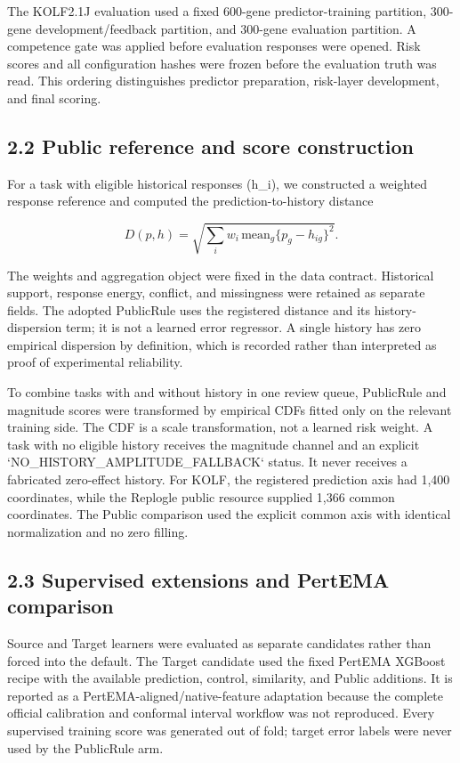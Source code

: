 \documentclass[journal]{IEEEtran}
\begin{document}
The KOLF2.1J evaluation used a fixed 600-gene predictor-training partition, 300-gene development/feedback partition, and 300-gene evaluation partition. A competence gate was applied before evaluation responses were opened. Risk scores and all configuration hashes were frozen before the evaluation truth was read. This ordering distinguishes predictor preparation, risk-layer development, and final scoring.

\subsection{2.2 Public reference and score construction}

For a task with eligible historical responses (h\_i), we constructed a weighted response reference and computed the prediction-to-history distance

\[
D(p,h)=\sqrt{\sum_i w_i\,\mathrm{mean}_g\{p_g-h_{ig}\}^2}.
\]

The weights and aggregation object were fixed in the data contract. Historical support, response energy, conflict, and missingness were retained as separate fields. The adopted PublicRule uses the registered distance and its history-dispersion term; it is not a learned error regressor. A single history has zero empirical dispersion by definition, which is recorded rather than interpreted as proof of experimental reliability.

To combine tasks with and without history in one review queue, PublicRule and magnitude scores were transformed by empirical CDFs fitted only on the relevant training side. The CDF is a scale transformation, not a learned risk weight. A task with no eligible history receives the magnitude channel and an explicit `NO\_HISTORY\_AMPLITUDE\_FALLBACK` status. It never receives a fabricated zero-effect history. For KOLF, the registered prediction axis had 1,400 coordinates, while the Replogle public resource supplied 1,366 common coordinates. The Public comparison used the explicit common axis with identical normalization and no zero filling.

\subsection{2.3 Supervised extensions and PertEMA comparison}

Source and Target learners were evaluated as separate candidates rather than forced into the default. The Target candidate used the fixed PertEMA XGBoost recipe with the available prediction, control, similarity, and Public additions. It is reported as a PertEMA-aligned/native-feature adaptation because the complete official calibration and conformal interval workflow was not reproduced. Every supervised training score was generated out of fold; target error labels were never used by the PublicRule arm.
\end{document}
